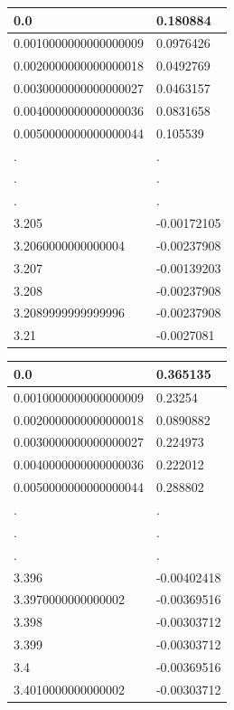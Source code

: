 \documentclass[a4paper, 12pt]{article}
\begin{document}
\begin{center}
\begin{tabular}{|l|l|}\hline
0.0&0.180884\\ \hline
0.0010000000000000009&0.0976426\\ \hline
0.0020000000000000018&0.0492769\\ \hline
0.0030000000000000027&0.0463157\\ \hline
0.0040000000000000036&0.0831658\\ \hline
0.0050000000000000044&0.105539\\ \hline
.&.\\
.&.\\
.&.\\
3.205&-0.00172105\\ \hline
3.2060000000000004&-0.00237908\\ \hline
3.207&-0.00139203\\ \hline
3.208&-0.00237908\\ \hline
3.2089999999999996&-0.00237908\\ \hline
3.21&-0.0027081\\ \hline
	\end{tabular}
\end{center}
\begin{center}
\begin{tabular}{|l|l|}\hline
0.0&0.365135\\ \hline
0.0010000000000000009&0.23254\\ \hline
0.0020000000000000018&0.0890882\\ \hline
0.0030000000000000027&0.224973\\ \hline
0.0040000000000000036&0.222012\\ \hline
0.0050000000000000044&0.288802\\ \hline
.&.\\
.&.\\
.&.\\
3.396&-0.00402418\\ \hline
3.3970000000000002&-0.00369516\\ \hline
3.398&-0.00303712\\ \hline
3.399&-0.00303712\\ \hline
3.4&-0.00369516\\ \hline
3.4010000000000002&-0.00303712\\ \hline
	\end{tabular}
\end{center}
\end{document}
